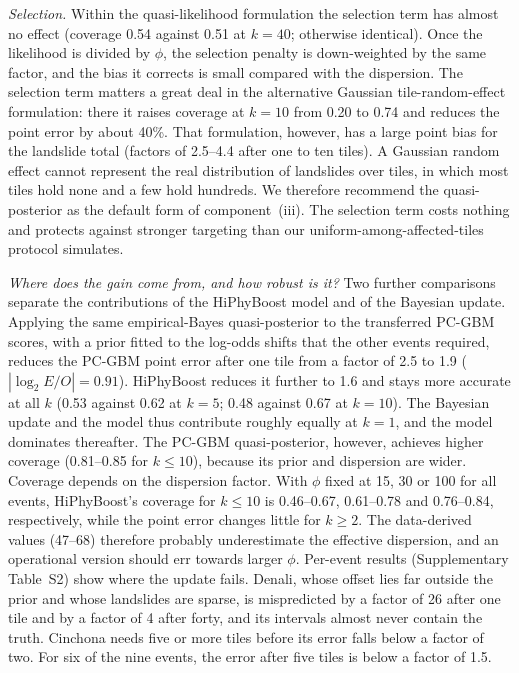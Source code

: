 \emph{Selection.} Within the quasi-likelihood formulation the selection term has almost no effect (coverage 0.54 against 0.51 at $k=40$; otherwise identical). Once the likelihood is divided by $\phi$, the selection penalty is down-weighted by the same factor, and the bias it corrects is small compared with the dispersion. The selection term matters a great deal in the alternative Gaussian tile-random-effect formulation: there it raises coverage at $k=10$ from 0.20 to 0.74 and reduces the point error by about 40\%. That formulation, however, has a large point bias for the landslide total (factors of 2.5--4.4 after one to ten tiles). A Gaussian random effect cannot represent the real distribution of landslides over tiles, in which most tiles hold none and a few hold hundreds. We therefore recommend the quasi-posterior as the default form of component~(iii). The selection term costs nothing and protects against stronger targeting than our uniform-among-affected-tiles protocol simulates.

\emph{Where does the gain come from, and how robust is it?} Two further comparisons separate the contributions of the HiPhyBoost model and of the Bayesian update. Applying the same empirical-Bayes quasi-posterior to the transferred PC-GBM scores, with a prior fitted to the log-odds shifts that the other events required, reduces the PC-GBM point error after one tile from a factor of 2.5 to 1.9 ($|\log_2 E/O|=0.91$). HiPhyBoost reduces it further to 1.6 and stays more accurate at all $k$ (0.53 against 0.62 at $k=5$; 0.48 against 0.67 at $k=10$). The Bayesian update and the model thus contribute roughly equally at $k=1$, and the model dominates thereafter. The PC-GBM quasi-posterior, however, achieves higher coverage (0.81--0.85 for $k\le 10$), because its prior and dispersion are wider. Coverage depends on the dispersion factor. With $\phi$ fixed at 15, 30 or 100 for all events, HiPhyBoost's coverage for $k\le10$ is 0.46--0.67, 0.61--0.78 and 0.76--0.84, respectively, while the point error changes little for $k\ge 2$. The data-derived values (47--68) therefore probably underestimate the effective dispersion, and an operational version should err towards larger $\phi$. Per-event results (Supplementary Table~S2) show where the update fails. Denali, whose offset lies far outside the prior and whose landslides are sparse, is mispredicted by a factor of 26 after one tile and by a factor of 4 after forty, and its intervals almost never contain the truth. Cinchona needs five or more tiles before its error falls below a factor of two. For six of the nine events, the error after five tiles is below a factor of 1.5.

